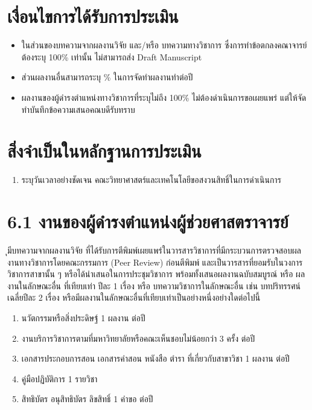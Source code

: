 \documentclass[a4paper,12pt,english]{sphinxmanual}
\begin{document}
\section{เงื่อนไขการได้รับการประเมิน}
\label{\detokenize{6academicposition:id2}}\begin{itemize}
\item {} 
ในส่วนของบทความจากผลงานวิจัย และ/หรือ บทความทางวิชาการ ซึ่งการทำข้อตกลงคณาจารย์ต้องระบุ 100\% เท่านั้น ไม่สามารถส่ง Draft Manuscript

\item {} 
ส่วนผลงานอื่นสามารถระบุ \% ในการจัดทำผลงานทำต่อปี

\item {} 
ผลงานของผู้ดำรงตำแหน่งทางวิชาการที่ระบุไม่ถึง 100\% ไม่ต้องดำเนินการขอเผยแพร่ แต่ให้จัดทำบันทึกข้อความเสนอคณบดีรับทราบ

\end{itemize}


\section{สิ่งจำเป็นในหลักฐานการประเมิน}
\label{\detokenize{6academicposition:id3}}\begin{enumerate}
%
\item {} 
 ระบุวันเวลาอย่างชัดเจน คณะวิทยาศาสตร์และเทคโนโลยีขอสงวนสิทธิ์ในการดำเนินการ

\end{enumerate}


\section{6.1 งานของผู้ดำรงตำแหน่งผู้ช่วยศาสตราจารย์}
\label{\detokenize{6academicposition:id4}}
ุมีบทความจากผลงานวิจัย ที่ได้รับการตีพิมพ์เผยแพร่ในวารสารวิชาการที่มีกระบวนการตรวจสอบผลงานทางวิชาการโดยคณะกรรมการ (Peer Review) ก่อนตีพิมพ์ และเป็นวารสารที่ยอมรับในวงการวิชาการสาขานั้น ๆ หรือได้นำเสนอในการประชุมวิชาการ พร้อมทั้งเสนอผลงานฉบับสมบูรณ์ หรือ ผลงานในลักษณะอื่น ที่เทียบเท่า ปีละ 1 เรื่อง หรือ บทความวิชาการในลักษณะอื่น เช่น บทปริทรรศน์ เฉลี่ยปีละ 2 เรื่อง หรือมีผลงานในลักษณะอื่นที่เทียบเท่าเป็นอย่างหนึ่งอย่างใดต่อไปนี้
\begin{enumerate}
%
\item {} 
นวัตกรรมหรือสิ่งประดิษฐ์ 1 ผลงาน ต่อปี

\item {} 
งานบริการวิชาการตามที่มหาวิทยาลัยหรือคณะเห็นชอบไม่น้อยกว่า 3 ครั้ง ต่อปี

\item {} 
เอกสารประกอบการสอน เอกสารคำสอน หนังสือ ตำรา ที่เกี่ยวกับสาขาวิชา 1 ผลงาน ต่อปี

\item {} 
คู่มือปฏิบัติการ 1 รายวิชา

\item {} 
สิทธิบัตร อนุสิทธิบัตร ลิขสิทธิ์ 1 คำขอ ต่อปี

\end{enumerate}
\end{document}
